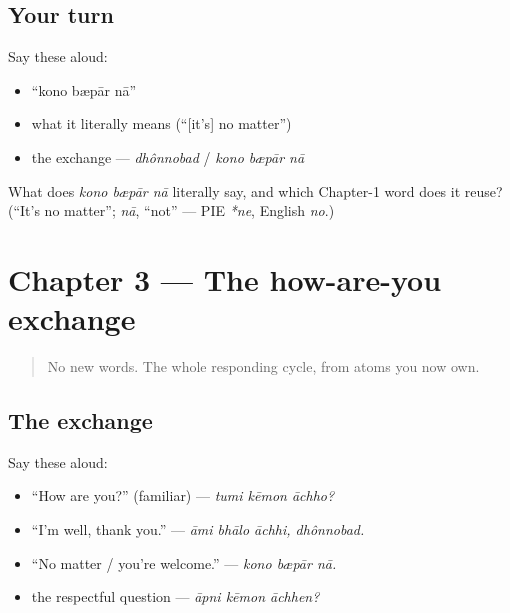 \subsection*{Your turn}
Say these aloud:

\begin{itemize}
\raggedright
  \item \textquotedblleft{}kono bæpār nā\textquotedblright{}
  \item what it literally means (\textquotedblleft{}{[}it's{]} no matter\textquotedblright{})
  \item the exchange — \emph{dhônnobad} / \emph{kono bæpār nā}
\end{itemize}

\begin{tcolorbox}[breakable,colback=teal!4,colframe=teal!35!black,title={Before you move on}]
What does \emph{kono bæpār nā} literally say, and which Chapter-1 word does it reuse? (\textquotedblleft{}It's no matter\textquotedblright{}; \emph{nā}, \textquotedblleft{}not\textquotedblright{} — PIE \emph{*ne}, English \emph{no}.)
\end{tcolorbox}
\section[Practice]{Chapter 3 — The how-are-you exchange}

\label{lesson:BN-C03-practice}



\begin{quote}
No new words. The whole responding cycle, from atoms you now own.
\end{quote}

\subsection*{The exchange}
Say these aloud:

\begin{itemize}
\raggedright
  \item \textquotedblleft{}How are you?\textquotedblright{} (familiar) — \emph{tumi kēmon āchho?}
  \item \textquotedblleft{}I'm well, thank you.\textquotedblright{} — \emph{āmi bhālo āchhi, dhônnobad.}
  \item \textquotedblleft{}No matter / you're welcome.\textquotedblright{} — \emph{kono bæpār nā.}
  \item the respectful question — \emph{āpni kēmon āchhen?}
\end{itemize}

